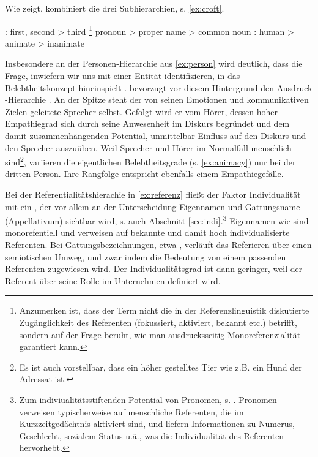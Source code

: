 Wie \textcite[130]{Croft2006} zeigt, kombiniert die  drei Subhierarchien, s. \ref{ex:croft}.

\begin{exe}
	\ex \label{ex:croft}
	\begin{xlist}
		\ex \label{ex:person} : first, second > third
		\ex \label{ex:referenz} \footnote{Anzumerken ist, dass der Term   nicht die in der Referenzlinguistik diskutierte Zugänglichkeit des Referenten (fokussiert, aktiviert, bekannt etc.) \parencite[vgl. etwa][]{Gundel1993} betrifft, sondern  auf der Frage beruht, wie man ausdrucksseitig Monoreferenzialität garantiert kann.} pronoun > proper name > common noun
		\ex \label{ex:animacy} : human > animate > inanimate
	\end{xlist}
\end{exe}
\noindent
Insbesondere an der Personen-Hierarchie aus \ref{ex:person} wird deutlich, dass die Frage, inwiefern wir uns mit einer Entität identifizieren, in das Belebtheitskonzept hineinspielt \parencite[10f. u. 25f.]{Yamamoto1999}. \textcite[307f.]{Langacker1991} bevorzugt vor diesem Hintergrund den Ausdruck -Hierarchie \parencite[ebenso][]{Lehmann2004a}. An der Spitze steht der von seinen Emotionen und kommunikativen Zielen geleitete Sprecher selbst. Gefolgt wird er vom Hörer, dessen hoher Empathiegrad sich durch seine Anwesenheit im Diskurs begründet und dem damit zusammenhängenden Potential, unmittelbar Einfluss auf den Diskurs und den Sprecher auszuüben.  Weil Sprecher und Hörer im Normalfall menschlich sind\footnote{Es ist auch vorstellbar, dass ein höher gestelltes Tier wie z.B. ein Hund der Adressat ist.}, variieren die eigentlichen Belebtheitsgrade (s. \ref{ex:animacy}) nur bei der dritten Person. Ihre Rangfolge entspricht ebenfalls einem Empathiegefälle. 

Bei der Referentialitätshierachie in \ref{ex:referenz} fließt der Faktor Individualität mit ein \parencite{Timberlake1977,Hopper1980,Dahl1996,Fraurud1996,Yamamoto1999}, der vor allem an der Unterscheidung Eigennamen und Gattungsname (Appellativum) sichtbar wird, s. auch Abschnitt \ref{sec:indi}.\footnote{Zum indiviualitätsstiftenden Potential von Pronomen, s. \textcite[29ff.]{Yamamoto1999}. Pronomen verweisen typischerweise auf menschliche Referenten, die im Kurzzeitgedächtnis aktiviert sind, und liefern Informationen zu Numerus, Geschlecht, sozialem Status u.ä., was die Individualität des Referenten hervorhebt.} Eigennamen wie  sind monorefentiell und verweisen auf bekannte und damit hoch individualisierte Referenten. Bei Gattungsbezeichnungen, etwa , verläuft das Referieren über einen semiotischen Umweg, und zwar indem die Bedeutung von  einem passenden Referenten zugewiesen wird. Der Individualitätsgrad ist dann geringer, weil der Referent über seine Rolle im Unternehmen definiert wird.

